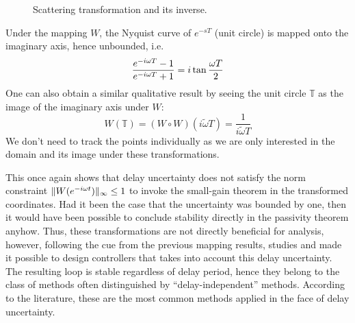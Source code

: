 \begin{figure}%
\centering
{}
\caption[Scattering transformation and its inverse.]{Scattering transformation and its inverse.}%
\label{lit:syn:invscat}%
\end{figure}


Under the mapping $W$, the Nyquist curve of $e^{-sT}$ (unit circle) is mapped onto the imaginary axis, 
hence unbounded, i.e.
\[
\frac{e^{-i\omega T}-1}{e^{-i\omega T}+1} = i\tan{\frac{\omega T}{2}}
\]
One can also obtain a similar qualitative result by seeing the unit circle $\mathbb{T}$ as the image of 
the imaginary axis under $W$: 
\[
W(\mathbb{T}) = (W\circ W)(i\widetilde{\omega} T) = \frac{1}{i\widetilde{\omega} T}
\]
We don't need to track the points individually as we are only interested in the domain and its image
under these transformations. 


This once again shows that delay uncertainty does not satisfy the norm constraint
$\|W(e^{-i\omega t})\|_\infty \leq 1$ to invoke the small-gain theorem in the transformed coordinates. 
Had it been the case that the uncertainty was bounded by one, then it would have been possible to 
conclude stability directly in the passivity theorem anyhow. Thus, these transformations are not directly 
beneficial for analysis, however, following the cue from the previous mapping results, studies 
\cite{andersonspong} and \cite{nieslotine} 
made it possible to design controllers that takes into account this delay uncertainty. The resulting 
loop is stable regardless of delay period, hence they belong to the class of methods often distinguished
by ``delay-independent'' methods. According to the literature, these are the most common methods
applied in the face of delay uncertainty.

